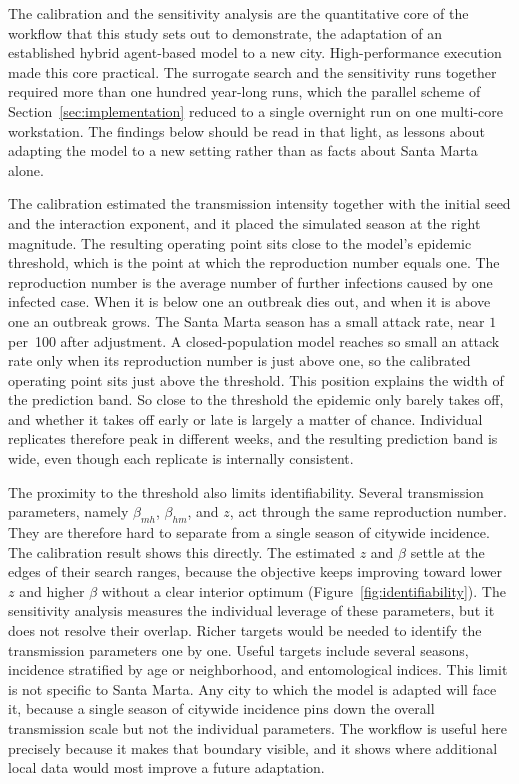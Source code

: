 \documentclass[applsci,article,accept,pdftex,moreauthors]{Definitions/mdpi}
\begin{document}
The calibration and the sensitivity analysis are the quantitative core of the workflow that this study sets out to demonstrate, the adaptation of an established hybrid agent-based model to a new city. High-performance execution made this core practical. The surrogate search and the sensitivity runs together required more than one hundred year-long runs, which the parallel scheme of Section~\ref{sec:implementation} reduced to a single overnight run on one multi-core workstation. The findings below should be read in that light, as lessons about adapting the model to a new setting rather than as facts about Santa Marta alone.

The calibration estimated the transmission intensity together with the initial seed and the interaction exponent, and it placed the simulated season at the right magnitude. The resulting operating point sits close to the model's epidemic threshold, which is the point at which the reproduction number equals one. The reproduction number is the average number of further infections caused by one infected case. When it is below one an outbreak dies out, and when it is above one an outbreak grows. The Santa Marta season has a small attack rate, near $1$ per~100 after adjustment. A closed-population model reaches so small an attack rate only when its reproduction number is just above one, so the calibrated operating point sits just above the threshold. This position explains the width of the prediction band. So close to the threshold the epidemic only barely takes off, and whether it takes off early or late is largely a matter of chance. Individual replicates therefore peak in different weeks, and the resulting prediction band is wide, even though each replicate is internally consistent.

The proximity to the threshold also limits identifiability. Several transmission parameters, namely $\beta_{mh}$, $\beta_{hm}$, and $z$, act through the same reproduction number. They are therefore hard to separate from a single season of citywide incidence. The calibration result shows this directly. The estimated $z$ and $\beta$ settle at the edges of their search ranges, because the objective keeps improving toward lower $z$ and higher $\beta$ without a clear interior optimum (Figure~\ref{fig:identifiability}). The sensitivity analysis measures the individual leverage of these parameters, but it does not resolve their overlap. Richer targets would be needed to identify the transmission parameters one by one. Useful targets include several seasons, incidence stratified by age or neighborhood, and entomological indices. This limit is not specific to Santa Marta. Any city to which the model is adapted will face it, because a single season of citywide incidence pins down the overall transmission scale but not the individual parameters. The workflow is useful here precisely because it makes that boundary visible, and it shows where additional local data would most improve a future adaptation.
\end{document}
